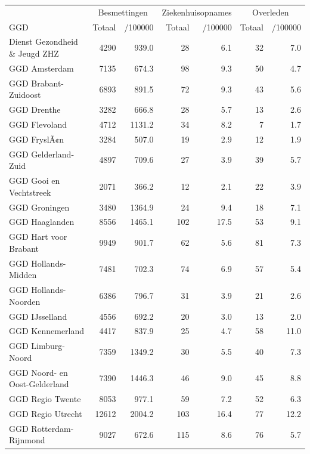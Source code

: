 \documentclass[
  english,
  man,floatsintext]{apa6}
\begin{document}
\begin{table}[H]
\centering\begingroup\fontsize{10}{12}\selectfont

\begin{threeparttable}
\begin{tabular}{lrrrrrr}
\toprule
\multicolumn{1}{c}{ } & \multicolumn{2}{c}{Besmettingen} & \multicolumn{2}{c}{Ziekenhuisopnames} & \multicolumn{2}{c}{Overleden} \\
\cmidrule(l{3pt}r{3pt}){2-3} \cmidrule(l{3pt}r{3pt}){4-5} \cmidrule(l{3pt}r{3pt}){6-7}
GGD & Totaal & /100000 & Totaal & /100000 & Totaal & /100000\\
\midrule
Dienst Gezondheid \& Jeugd ZHZ & 4290 & 939.0 & 28 & 6.1 & 32 & 7.0\\
GGD Amsterdam & 7135 & 674.3 & 98 & 9.3 & 50 & 4.7\\
GGD Brabant-Zuidoost & 6893 & 891.5 & 72 & 9.3 & 43 & 5.6\\
GGD Drenthe & 3282 & 666.8 & 28 & 5.7 & 13 & 2.6\\
GGD Flevoland & 4712 & 1131.2 & 34 & 8.2 & 7 & 1.7\\
GGD FryslÃ¢n & 3284 & 507.0 & 19 & 2.9 & 12 & 1.9\\
GGD Gelderland-Zuid & 4897 & 709.6 & 27 & 3.9 & 39 & 5.7\\
GGD Gooi en Vechtstreek & 2071 & 366.2 & 12 & 2.1 & 22 & 3.9\\
GGD Groningen & 3480 & 1364.9 & 24 & 9.4 & 18 & 7.1\\
GGD Haaglanden & 8556 & 1465.1 & 102 & 17.5 & 53 & 9.1\\
GGD Hart voor Brabant & 9949 & 901.7 & 62 & 5.6 & 81 & 7.3\\
GGD Hollands-Midden & 7481 & 702.3 & 74 & 6.9 & 57 & 5.4\\
GGD Hollands-Noorden & 6386 & 796.7 & 31 & 3.9 & 21 & 2.6\\
GGD IJsselland & 4556 & 692.2 & 20 & 3.0 & 13 & 2.0\\
GGD Kennemerland & 4417 & 837.9 & 25 & 4.7 & 58 & 11.0\\
GGD Limburg-Noord & 7359 & 1349.2 & 30 & 5.5 & 40 & 7.3\\
GGD Noord- en Oost-Gelderland & 7390 & 1446.3 & 46 & 9.0 & 45 & 8.8\\
GGD Regio Twente & 8053 & 977.1 & 59 & 7.2 & 52 & 6.3\\
GGD Regio Utrecht & 12612 & 2004.2 & 103 & 16.4 & 77 & 12.2\\
GGD Rotterdam-Rijnmond & 9027 & 672.6 & 115 & 8.6 & 76 & 5.7\\

\end{tabular}
\end{threeparttable}
\end{table}
\end{document}
